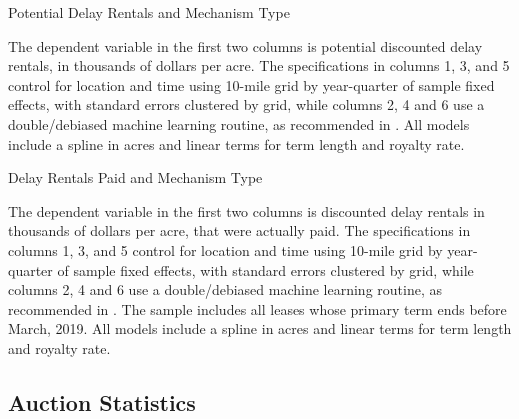 \documentclass[12pt]{article}
\begin{document}
\begin{appendices}
\addtolength{\tabcolsep}{6pt}
\begin{table}[H]
	\begin{center}
	\begin{threeparttable}
		\caption{Potential Delay Rentals and Mechanism Type}
		\small
		            
		\begin{tablenotes}
		\footnotesize
		\item The dependent variable in the first two columns is potential discounted delay rentals, in thousands of dollars per acre.  The specifications in columns 1, 3, and 5 control for location and time using 10-mile grid by year-quarter of sample fixed effects, with standard errors clustered by grid, while columns 2, 4 and 6 use a double/debiased machine learning routine, as recommended in \cite{chernozhukov2018double}. All models include a spline in acres and linear terms for term length and royalty rate.    
		\end{tablenotes}
	\end{threeparttable}
	\end{center}
\end{table}

\begin{table}[H]
	\begin{center}
	\begin{threeparttable}
		\caption{Delay Rentals Paid and Mechanism Type}
		\small
		            
		\begin{tablenotes}
		\footnotesize
		\item The dependent variable in the first two columns is discounted delay rentals in thousands of dollars per acre, that were actually paid.  The specifications in columns 1, 3, and 5 control for location and time using 10-mile grid by year-quarter of sample fixed effects, with standard errors clustered by grid, while columns 2, 4 and 6 use a double/debiased machine learning routine, as recommended in \cite{chernozhukov2018double}. The sample includes all leases whose primary term ends before March, 2019.  All models include a spline in acres and linear terms for term length and royalty rate.    
		\end{tablenotes}
	\end{threeparttable}
	\end{center}
\end{table}
\addtolength{\tabcolsep}{-6pt}

\subsection{Auction Statistics}\label{sec:delays}


\end{appendices}
\end{document}
